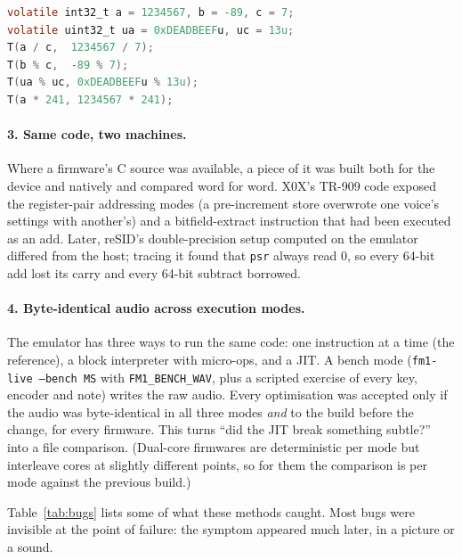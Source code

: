 \documentclass[10pt,a4paper]{article}
\newcommand{\code}[1]{\texttt{#1}}
\begin{document}
\begin{lstlisting}[language=C,caption={From \code{probes/arith.c}. \code{T(runtime, folded)}: the
first argument compiles to pi32v2 instructions, the second to a constant.},label={lst:probe},captionpos=b]
volatile int32_t a = 1234567, b = -89, c = 7;
volatile uint32_t ua = 0xDEADBEEFu, uc = 13u;
T(a / c,  1234567 / 7);
T(b % c,  -89 % 7);
T(ua % uc, 0xDEADBEEFu % 13u);
T(a * 241, 1234567 * 241);
\end{lstlisting}

\paragraph{3. Same code, two machines.} Where a firmware's C source was available, a piece of it was
built both for the device and natively and compared word for word. X0X's TR-909 code exposed the
register-pair addressing modes (a pre-increment store overwrote one voice's settings with another's)
and a bitfield-extract instruction that had been executed as an add. Later, reSID's double-precision
setup computed on the emulator differed from the host; tracing it found that \code{psr} always read
0, so every 64-bit add lost its carry and every 64-bit subtract borrowed.

\paragraph{4. Byte-identical audio across execution modes.} The emulator has three ways to run the
same code: one instruction at a time (the reference), a block interpreter with micro-ops, and a JIT.
A bench mode (\code{fm1-live --bench MS} with \code{FM1\_BENCH\_WAV}, plus a scripted exercise of
every key, encoder and note) writes the raw audio. Every optimisation was accepted only if the audio
was byte-identical in all three modes \emph{and} to the build before the change, for every
firmware. This turns ``did the JIT break something subtle?'' into a file comparison. (Dual-core
firmwares are deterministic per mode but interleave cores at slightly different points, so for
them the comparison is per mode against the previous build.)

Table~\ref{tab:bugs} lists some of what these methods caught. Most bugs were invisible at the point
of failure: the symptom appeared much later, in a picture or a sound.
\end{document}
